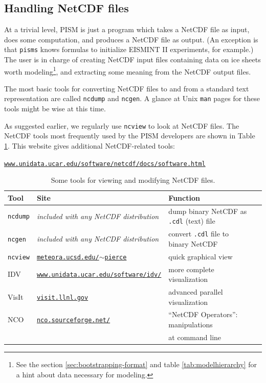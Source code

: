 \documentclass[11pt,final]{amsart}
\renewcommand{\t}[1]{\texttt{#1}}
\begin{document}
\subsection{Handling NetCDF files}\label{subsect:nctoolsintro}  At a trivial level, PISM is just a program which takes a NetCDF file as input, does some computation, and produces a NetCDF file as output.  (An exception is that \verb|pisms| knows formulas to initialize EISMINT II experiments, for example.)  The user is in charge of creating NetCDF input files containing data on ice sheets worth modeling\footnote{See the section \ref{sec:bootstrapping-format} and table \ref{tab:modelhierarchy} for a hint about data necessary for modeling.}, and extracting some meaning from the NetCDF output files.

The most basic tools for converting NetCDF files to and from a standard text representation are called \verb|ncdump| and \verb|ncgen|.  A glance at Unix \verb|man| pages for these tools might be wise at this time.

As suggested earlier, we regularly use \verb|ncview| to look at NetCDF files.  The NetCDF tools most frequently used by the PISM developers are shown in Table \ref{tab:NetCDFview}.  This website gives additional NetCDF-related tools:

\centerline{ \href{http://www.unidata.ucar.edu/software/netcdf/docs/software.html}{\t{www.unidata.ucar.edu/software/netcdf/docs/software.html}} } 

\begin{table}[ht]
\caption{Some tools for viewing and modifying NetCDF files.}\label{tab:NetCDFview} 
\small
\begin{tabular}{@{}llll}\hline
\textbf{Tool} & \textbf{Site} & \textbf{Function}\\ \hline
\verb|ncdump| & \emph{included with any NetCDF distribution} & dump binary NetCDF as \texttt{.cdl} (text) file \\
\verb|ncgen| & \emph{included with any NetCDF distribution} & convert \texttt{.cdl} file to binary NetCDF \\
\verb|ncview|\index{ncview} & \href{http://meteora.ucsd.edu/~pierce/ncview_home_page.html}{\texttt{meteora.ucsd.edu/$\sim$pierce}} & quick graphical view \\
IDV & \href{http://www.unidata.ucar.edu/software/idv/}{\t{www.unidata.ucar.edu/software/idv/}} & more complete visualization \\
VisIt & \href{http://visit.llnl.gov}{\t{visit.llnl.gov}} & advanced parallel visualization \\
NCO\index{NCO (NetCDF Operators)} & \href{http://nco.sourceforge.net/}{\t{nco.sourceforge.net/}} & ``NetCDF Operators'': manipulations \\
\quad  & & \quad at command line
\end{tabular}
\normalsize
\end{table}
\end{document}

